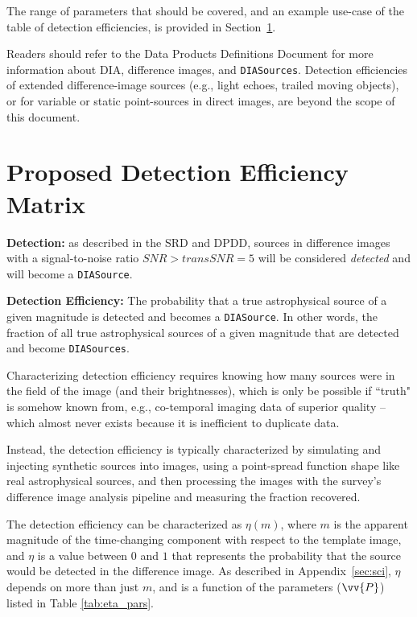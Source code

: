 \documentclass[DM,lsstdraft,toc]{lsstdoc}
\begin{document}
The range of parameters that should be covered, and an example use-case of the table of detection efficiencies, is provided in Section~\ref{sec:proposal}. 

Readers should refer to the Data Products Definitions Document  for more information about DIA, difference images, and {\tt DIASources}.
Detection efficiencies of extended difference-image sources (e.g., light echoes, trailed moving objects), or for variable or static point-sources in direct images, are beyond the scope of this document.


\clearpage
\section{Proposed Detection Efficiency Matrix}\label{sec:proposal}

{\bf Detection:} as described in the SRD and DPDD, sources in difference images with a signal-to-noise ratio $SNR > {transSNR} = 5$ will be considered {\it detected} and will become a {\tt DIASource}.
 
{\bf Detection Efficiency:} The probability that a true astrophysical source of a given magnitude is detected and becomes a {\tt DIASource}. In other words, the fraction of all true astrophysical sources of a given magnitude that are detected and become {\tt DIASources}. 

Characterizing detection efficiency requires knowing how many sources were in the field of the image (and their brightnesses), which is only be possible if ``truth" is somehow known from, e.g., co-temporal imaging data of superior quality -- which almost never exists because it is inefficient to duplicate data.

Instead, the detection efficiency is typically characterized by simulating and injecting synthetic sources into images, using a point-spread function shape like real astrophysical sources, and then processing the images with the survey's difference image analysis pipeline and measuring the fraction recovered.

The detection efficiency can be characterized as $\eta(m)$, where $m$ is the apparent magnitude of the time-changing component with respect to the template image, and $\eta$ is a value between $0$ and $1$ that represents the probability that the source would be detected in the difference image.
As described in Appendix~\ref{sec:sci}, $\eta$ depends on more than just $m$, and is a function of the parameters ($\vv{P}$) listed in Table \ref{tab:eta_pars}.
\end{document}
